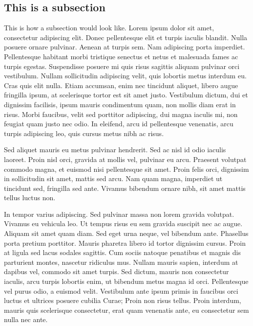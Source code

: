 \subsection{This is a subsection}

This is how a subsection would look like.  Lorem ipsum dolor sit amet, consectetur adipiscing elit. Donec pellentesque elit et turpis iaculis blandit. Nulla posuere ornare pulvinar. Aenean at turpis sem. Nam adipiscing porta imperdiet. Pellentesque habitant morbi tristique senectus et netus et malesuada fames ac turpis egestas. Suspendisse posuere mi quis risus sagittis aliquam pulvinar orci vestibulum. Nullam sollicitudin adipiscing velit, quis lobortis metus interdum eu. Cras quis elit nulla. Etiam accumsan, enim nec tincidunt aliquet, libero augue fringilla ipsum, at scelerisque tortor est sit amet justo. Vestibulum dictum, dui et dignissim facilisis, ipsum mauris condimentum quam, non mollis diam erat in risus. Morbi faucibus, velit sed porttitor adipiscing, dui magna iaculis mi, non feugiat quam justo nec odio. In eleifend, arcu id pellentesque venenatis, arcu turpis adipiscing leo, quis cursus metus nibh ac risus.

Sed aliquet mauris eu metus pulvinar hendrerit. Sed ac nisl id odio iaculis laoreet. Proin nisl orci, gravida at mollis vel, pulvinar eu arcu. Praesent volutpat commodo magna, et euismod nisi pellentesque sit amet. Proin felis orci, dignissim in sollicitudin sit amet, mattis sed arcu. Nam quam magna, imperdiet ut tincidunt sed, fringilla sed ante. Vivamus bibendum ornare nibh, sit amet mattis tellus luctus non.

In tempor varius adipiscing. Sed pulvinar massa non lorem gravida volutpat. Vivamus eu vehicula leo. Ut tempus risus eu sem gravida suscipit nec ac augue. Aliquam sit amet quam diam. Sed eget urna neque, vel bibendum ante. Phasellus porta pretium porttitor. Mauris pharetra libero id tortor dignissim cursus. Proin at ligula sed lacus sodales sagittis. Cum sociis natoque penatibus et magnis dis parturient montes, nascetur ridiculus mus. Nullam mauris sapien, interdum at dapibus vel, commodo sit amet turpis. Sed dictum, mauris non consectetur iaculis, arcu turpis lobortis enim, ut bibendum metus magna id orci. Pellentesque vel purus odio, a euismod velit. Vestibulum ante ipsum primis in faucibus orci luctus et ultrices posuere cubilia Curae; Proin non risus tellus. Proin interdum, mauris quis scelerisque consectetur, erat quam venenatis ante, eu consectetur sem nulla nec ante. 
